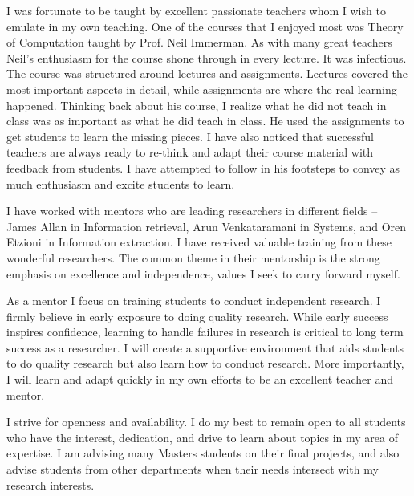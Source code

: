 \documentclass[a4paper,11pt,onecolumn]{article}
\begin{document}

I was fortunate to be taught by excellent passionate teachers whom I wish to emulate in my own teaching. One of the courses that I enjoyed most was Theory of Computation taught by Prof. Neil Immerman. As with many great teachers Neil's enthusiasm for the course shone through in every lecture. It was infectious. The course was structured around lectures and assignments. Lectures covered the most important aspects in detail, while assignments are where the real learning happened. Thinking back about his course, I realize what he did not teach in class was as important as what he did teach in class. He used the assignments to get students to learn the missing pieces. I have also noticed that successful teachers are always ready to re-think and adapt their course material with feedback from students. I have attempted to follow in his footsteps to convey as much enthusiasm and excite students to learn. 

I have worked with mentors who are leading researchers in different fields -- James Allan in Information retrieval, Arun Venkataramani in Systems, and Oren Etzioni in Information extraction. I have received valuable training from these wonderful researchers. The common theme in their mentorship is the strong emphasis on excellence and independence, values I seek to carry forward myself. 

As a mentor I focus on training students to conduct independent research. I firmly believe in early exposure to doing quality research. While early success inspires confidence, learning to handle failures in research is critical to long term success as a researcher. I will create a supportive environment that aids students to do quality research but also learn how to conduct research. More importantly, I will learn and adapt quickly in my own efforts to be an excellent teacher and mentor.

I strive for openness and availability. I do my best to remain open to all students who have the interest, dedication, and drive to learn about topics in my area of expertise. I am advising many Masters students on their final projects, and also advise students from other departments when their needs intersect with my research interests. 
\end{document}
